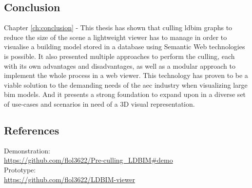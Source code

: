 \begin{refsection}
\begin{multicols}{2}
        \subsection*{Conclusion}
        \textsf{Chapter \ref{ch:conclusion} -} This thesis has shown that culling \ac{ldbim} graphs to reduce the size of the scene a lightweight viewer has to manage in order to visualise a building model stored in a database using Semantic Web technologies is possible. It also presented multiple approaches to perform the culling, each with its own advantages and disadvantages, as well as a modular approach to implement the whole process in a web viewer. This technology has proven to be a viable solution to the demanding needs of the \ac{aec} industry when visualizing large \ac{bim} models. And it presents a strong foundation to expand upon in a diverse set of use-cases and scenarios in need of a 3D visual representation.

        \subsection*{References}
        {\renewcommand*{\bibfont}{\small}
            \printbibliography}
        {\footnotesize
            \textsf{Demonstration:}\\
            \url{https://github.com/flol3622/Pre-culling_LDBIM#demo}\\
            \textsf{Prototype:}\\
            \url{https://github.com/flol3622/LDBIM-viewer}}


    \end{multicols}

\end{refsection}

\restoregeometry